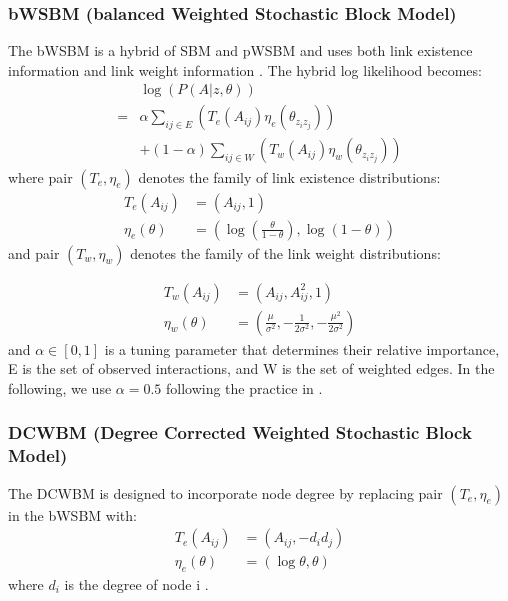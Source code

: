 \documentclass{article}
\begin{document}
\subsubsection{bWSBM (balanced Weighted Stochastic Block Model)}
The bWSBM is a hybrid of SBM and pWSBM
and uses both link existence information and link weight information \cite{aicher2014learning}.
The hybrid log likelihood becomes:
\begin{align*}
&\log(P(A|z, \theta))\\
=& \alpha \sum_{ij \in E} (T_e(A_{ij}) \eta_e(\theta_{z_i z_j}))\\
& + (1 - \alpha) \sum_{ij \in W} (T_w(A_{ij}) \eta_w(\theta_{z_i z_j}))
\end{align*}
where pair $ (T_e, \eta_e) $ denotes the family of link existence distributions:
\begin{align*}
T_e(A_{ij}) &= (A_{ij}, 1)\\
\eta_e(\theta) &= ( \log(\frac{\theta}{1-\theta}), \log(1-\theta) )
\end{align*}
and pair $ (T_w, \eta_w) $ denotes the family of the link weight distributions:

\begin{align*}
T_w(A_{ij}) &= (A_{ij}, A_{ij}^2, 1)\\
\eta_w(\theta)
&= (\frac{\mu}{\sigma^2}, -\frac{1}{2\sigma^2}, -\frac{\mu^2}{2\sigma^2})
\end{align*}
and $ \alpha \in [0, 1]$ is a tuning parameter that determines their relative importance,
E is the set of observed interactions,
and W is the set of weighted edges.
In the following, we use $ \alpha = 0.5 $ following the practice in \cite{aicher2014learning}.

\subsubsection{DCWBM (Degree Corrected Weighted Stochastic Block Model)}
The DCWBM is designed to incorporate node degree
by replacing pair $ (T_e, \eta_e) $ in the bWSBM with:
\begin{align*}
T_e(A_{ij}) &= (A_{ij}, -d_id_j)\\
\eta_e(\theta) &= (\log\theta, \theta)
\end{align*}
where $ d_i $ is the degree of node i \cite{aicher2014learning}.
\end{document}
